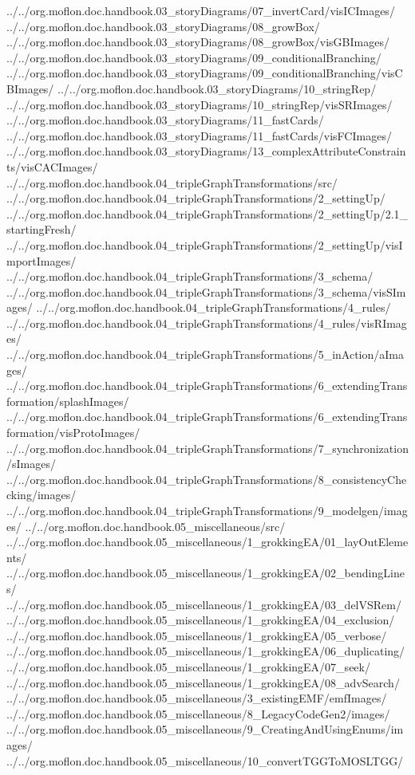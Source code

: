 {{../../org.moflon.doc.handbook.03_storyDiagrams/07_invertCard/visICImages/}%
{../../org.moflon.doc.handbook.03_storyDiagrams/08_growBox/}%
{../../org.moflon.doc.handbook.03_storyDiagrams/08_growBox/visGBImages/}%
{../../org.moflon.doc.handbook.03_storyDiagrams/09_conditionalBranching/}%
{../../org.moflon.doc.handbook.03_storyDiagrams/09_conditionalBranching/visCBImages/}%
{../../org.moflon.doc.handbook.03_storyDiagrams/10_stringRep/}%
{../../org.moflon.doc.handbook.03_storyDiagrams/10_stringRep/visSRImages/}%
{../../org.moflon.doc.handbook.03_storyDiagrams/11_fastCards/}%
{../../org.moflon.doc.handbook.03_storyDiagrams/11_fastCards/visFCImages/}%
{../../org.moflon.doc.handbook.03_storyDiagrams/13_complexAttributeConstraints/visCACImages/}%
%
{../../org.moflon.doc.handbook.04_tripleGraphTransformations/src/}%
{../../org.moflon.doc.handbook.04_tripleGraphTransformations/2_settingUp/}%
{../../org.moflon.doc.handbook.04_tripleGraphTransformations/2_settingUp/2.1_startingFresh/}%
{../../org.moflon.doc.handbook.04_tripleGraphTransformations/2_settingUp/visImportImages/}%
{../../org.moflon.doc.handbook.04_tripleGraphTransformations/3_schema/}%
{../../org.moflon.doc.handbook.04_tripleGraphTransformations/3_schema/visSImages/}%
{../../org.moflon.doc.handbook.04_tripleGraphTransformations/4_rules/}%
{../../org.moflon.doc.handbook.04_tripleGraphTransformations/4_rules/visRImages/}%
{../../org.moflon.doc.handbook.04_tripleGraphTransformations/5_inAction/aImages/}%
{../../org.moflon.doc.handbook.04_tripleGraphTransformations/6_extendingTransformation/splashImages/}%
{../../org.moflon.doc.handbook.04_tripleGraphTransformations/6_extendingTransformation/visProtoImages/}%
{../../org.moflon.doc.handbook.04_tripleGraphTransformations/7_synchronization/sImages/}%
{../../org.moflon.doc.handbook.04_tripleGraphTransformations/8_consistencyChecking/images/}
{../../org.moflon.doc.handbook.04_tripleGraphTransformations/9_modelgen/images/}%
%
{../../org.moflon.doc.handbook.05_miscellaneous/src/}%
{../../org.moflon.doc.handbook.05_miscellaneous/1_grokkingEA/01_layOutElements/}%
{../../org.moflon.doc.handbook.05_miscellaneous/1_grokkingEA/02_bendingLines/}%
{../../org.moflon.doc.handbook.05_miscellaneous/1_grokkingEA/03_delVSRem/}%
{../../org.moflon.doc.handbook.05_miscellaneous/1_grokkingEA/04_exclusion/}%
{../../org.moflon.doc.handbook.05_miscellaneous/1_grokkingEA/05_verbose/}%
{../../org.moflon.doc.handbook.05_miscellaneous/1_grokkingEA/06_duplicating/}%
{../../org.moflon.doc.handbook.05_miscellaneous/1_grokkingEA/07_seek/}%
{../../org.moflon.doc.handbook.05_miscellaneous/1_grokkingEA/08_advSearch/}%
{../../org.moflon.doc.handbook.05_miscellaneous/3_existingEMF/emfImages/}%
{../../org.moflon.doc.handbook.05_miscellaneous/8_LegacyCodeGen2/images/}%
{../../org.moflon.doc.handbook.05_miscellaneous/9_CreatingAndUsingEnums/images/}%
{../../org.moflon.doc.handbook.05_miscellaneous/10_convertTGGToMOSLTGG/}
}

